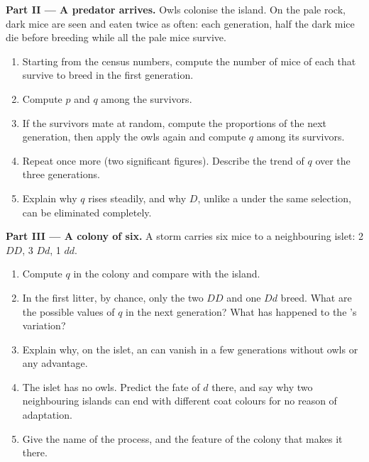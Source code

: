 \begin{problem}
\medskip
\noindent\textbf{Part II --- A predator arrives.}
Owls colonise the island. On the pale rock, dark mice are seen and
eaten twice as often: each generation, half the dark mice die before
breeding while all the pale mice survive.
\begin{enumerate}[resume]
  \item Starting from the census numbers, compute the number of mice of
        each  that survive to breed in the first generation.
  \item Compute $p$ and $q$ among the survivors.
  \item If the survivors mate at random, compute the 
        proportions of the next generation, then apply the owls again
        and compute $q$ among its survivors.
  \item Repeat once more (two significant figures). Describe the trend
        of $q$ over the three generations.
  \item Explain why $q$ rises steadily, and why $D$, unlike a
          under the same selection, can be eliminated
        completely.
\end{enumerate}

\medskip
\noindent\textbf{Part III --- A colony of six.}
A storm carries six mice to a neighbouring islet: 2 $DD$, 3 $Dd$, 1 $dd$.
\begin{enumerate}[resume]
  \item Compute $q$ in the colony and compare with the island.
  \item In the first litter, by chance, only the two $DD$ and one $Dd$
        breed. What are the possible values of $q$ in the next
        generation? What has happened to the 's variation?
  \item Explain why, on the islet, an  can vanish in a few
        generations without owls or any advantage.
  \item The islet has no owls. Predict the fate of $d$ there, and say
        why two neighbouring islands can end with different coat
        colours for no reason of adaptation.
  \item Give the name of the process, and the feature of the colony
        that makes it  there.
\end{enumerate}


\end{problem}
